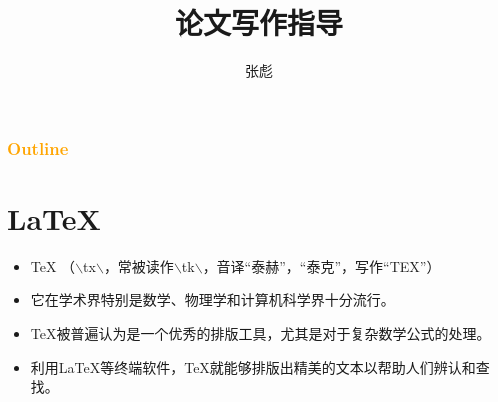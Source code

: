 \documentclass[13pt,fontset=mac]{ctexbeamer}
\begin{document}
\title[]{论文写作指导}
\author[]{{\large 张彪} }

\date{}


%



\begin{frame}
\maketitle
\end{frame}


\begin{frame}
	\frametitle{\textcolor{orange}{Outline}}
	\tableofcontents
\end{frame}




\section{LaTeX}


\begin{frame}
	\begin{itemize}
	\item 	TeX
（$\backslash$t\textepsilon x$\backslash$，常被读作$\backslash$t\textepsilon k$\backslash$，音译“泰赫”，“泰克”，写作“TEX”）

\item 它在学术界特别是数学、物理学和计算机科学界十分流行。
	\item
TeX被普遍认为是一个优秀的排版工具，尤其是对于复杂数学公式的处理。
	\item
利用LaTeX等终端软件，TeX就能够排版出精美的文本以帮助人们辨认和查找。
\end{itemize}
\end{frame}
\end{document}
